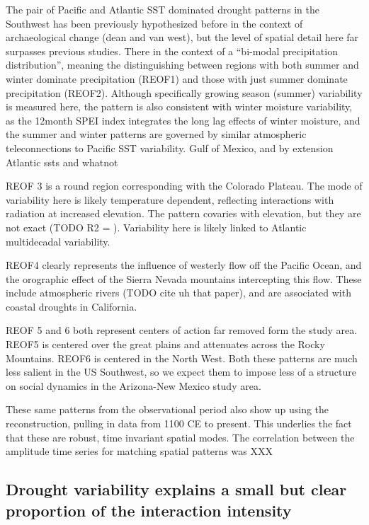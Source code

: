 \documentclass[fleqn,10pt]{wlscirep}
\begin{document}
The pair of Pacific and Atlantic SST dominated drought patterns in the Southwest has been previously hypothesized before in the context of archaeological change (dean and van west), but the level of spatial detail here far surpasses previous studies. There in the context of a ``bi-modal precipitation distribution'', meaning the distinguishing between regions with both summer and winter dominate precipitation (REOF1) and those with just summer dominate precipitation (REOF2). Although specifically growing season (summer) variability is measured here, the pattern is also consistent with winter moisture variability, as the 12month SPEI index integrates the long lag effects of winter moisture, and the summer and winter patterns are governed by similar atmospheric teleconnections to Pacific SST variability.
Gulf of Mexico, and by extension Atlantic ssts and whatnot

REOF 3 is a round region corresponding with the Colorado Plateau. The mode of variability here is likely temperature dependent, reflecting interactions with radiation at increased elevation. The pattern covaries with elevation, but they are not exact (TODO R2 = ). Variability here is likely linked to Atlantic multidecadal variability.

REOF4 clearly represents the influence of westerly flow off the Pacific Ocean, and the orographic effect of the Sierra Nevada mountains intercepting this flow. These include atmospheric rivers (TODO cite uh that paper), and are associated with coastal droughts in California.

REOF 5 and 6 both represent centers of action far removed form the study area. REOF5 is centered over the great plains and attenuates across the Rocky Mountains. REOF6 is centered in the North West. Both these patterns are much less salient in the US Southwest, so we expect them to impose less of a structure on social dynamics in the Arizona-New Mexico study area.

These same patterns from the observational period also show up using the reconstruction, pulling in data from 1100 CE to present. This underlies the fact that these are robust, time invariant spatial modes. The correlation between the amplitude time series for matching spatial patterns was XXX


\subsection*{Drought variability explains a small but clear proportion of the interaction intensity}
\end{document}
